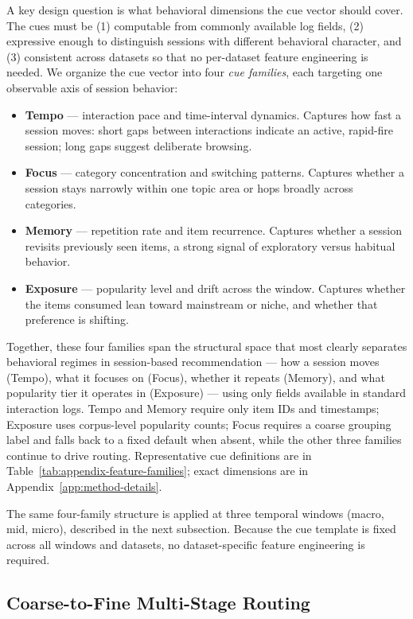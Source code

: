 \documentclass[sigconf,review,anonymous]{acmart}
\begin{document}
A key design question is what behavioral dimensions the cue vector should cover. The cues must be (1) computable from commonly available log fields, (2) expressive enough to distinguish sessions with different behavioral character, and (3) consistent across datasets so that no per-dataset feature engineering is needed. We organize the cue vector into four \emph{cue families}, each targeting one observable axis of session behavior:
\begin{itemize}
  \item \textbf{Tempo} --- interaction pace and time-interval dynamics. Captures how fast a session moves: short gaps between interactions indicate an active, rapid-fire session; long gaps suggest deliberate browsing.
  \item \textbf{Focus} --- category concentration and switching patterns. Captures whether a session stays narrowly within one topic area or hops broadly across categories.
  \item \textbf{Memory} --- repetition rate and item recurrence. Captures whether a session revisits previously seen items, a strong signal of exploratory versus habitual behavior.
  \item \textbf{Exposure} --- popularity level and drift across the window. Captures whether the items consumed lean toward mainstream or niche, and whether that preference is shifting.
\end{itemize}
Together, these four families span the structural space that most clearly separates behavioral regimes in session-based recommendation --- how a session moves (Tempo), what it focuses on (Focus), whether it repeats (Memory), and what popularity tier it operates in (Exposure) --- using only fields available in standard interaction logs. Tempo and Memory require only item IDs and timestamps; Exposure uses corpus-level popularity counts; Focus requires a coarse grouping label and falls back to a fixed default when absent, while the other three families continue to drive routing. Representative cue definitions are in Table~\ref{tab:appendix-feature-families}; exact dimensions are in Appendix~\ref{app:method-details}.

The same four-family structure is applied at three temporal windows (macro, mid, micro), described in the next subsection. Because the cue template is fixed across all windows and datasets, no dataset-specific feature engineering is required.

\subsection{Coarse-to-Fine Multi-Stage Routing}
\label{sec:multi-stage-routing}
\end{document}
